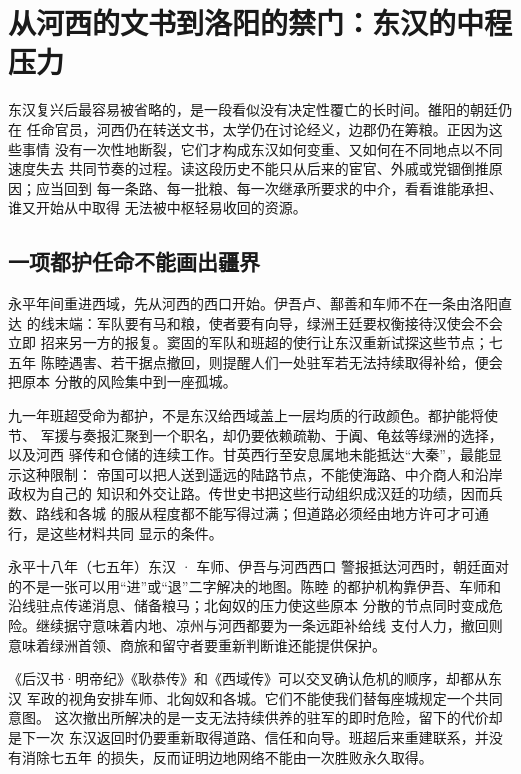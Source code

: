 \section{从河西的文书到洛阳的禁门：东汉的中程压力}
\label{sec:eastern-han-second-century-depth}

东汉复兴后最容易被省略的，是一段看似没有决定性覆亡的长时间。雒阳的朝廷仍在
任命官员，河西仍在转送文书，太学仍在讨论经义，边郡仍在筹粮。正因为这些事情
没有一次性地断裂，它们才构成东汉如何变重、又如何在不同地点以不同速度失去
共同节奏的过程。读这段历史不能只从后来的宦官、外戚或党锢倒推原因；应当回到
每一条路、每一批粮、每一次继承所要求的中介，看看谁能承担、谁又开始从中取得
无法被中枢轻易收回的资源。

\subsection{一项都护任命不能画出疆界}

永平年间重进西域，先从河西的西口开始。伊吾卢、鄯善和车师不在一条由洛阳直达
的线末端：军队要有马和粮，使者要有向导，绿洲王廷要权衡接待汉使会不会立即
招来另一方的报复。窦固的军队和班超的使行让东汉重新试探这些节点；七五年
陈睦遇害、若干据点撤回，则提醒人们一处驻军若无法持续取得补给，便会把原本
分散的风险集中到一座孤城。

九一年班超受命为都护，不是东汉给西域盖上一层均质的行政颜色。都护能将使节、
军援与奏报汇聚到一个职名，却仍要依赖疏勒、于阗、龟兹等绿洲的选择，以及河西
驿传和仓储的连续工作。甘英西行至安息属地未能抵达“大秦”，最能显示这种限制：
帝国可以把人送到遥远的陆路节点，不能使海路、中介商人和沿岸政权为自己的
知识和外交让路。传世史书把这些行动组织成汉廷的功绩，因而兵数、路线和各城
的服从程度都不能写得过满；但道路必须经由地方许可才可通行，是这些材料共同
显示的条件。

\begin{event}{}{永平十八年（七五年）}{东汉 · 车师、伊吾与河西西口}{}
警报抵达河西时，朝廷面对的不是一张可以用“进”或“退”二字解决的地图。陈睦
的都护机构靠伊吾、车师和沿线驻点传递消息、储备粮马；北匈奴的压力使这些原本
分散的节点同时变成危险。继续据守意味着内地、凉州与河西都要为一条远距补给线
支付人力，撤回则意味着绿洲首领、商旅和留守者要重新判断谁还能提供保护。

《后汉书·明帝纪》《耿恭传》和《西域传》可以交叉确认危机的顺序，却都从东汉
军政的视角安排车师、北匈奴和各城。它们不能使我们替每座城规定一个共同意图。
这次撤出所解决的是一支无法持续供养的驻军的即时危险，留下的代价却是下一次
东汉返回时仍要重新取得道路、信任和向导。班超后来重建联系，并没有消除七五年
的损失，反而证明边地网络不能由一次胜败永久取得。
\end{event}

